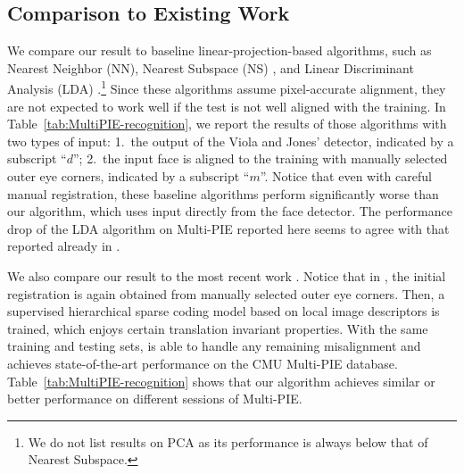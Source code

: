 \documentclass[12pt,journal,draftcls,letterpaper,onecolumn]{IEEEtran}
\begin{document}
\subsection{Comparison to Existing Work}
We compare our result to baseline linear-projection-based
algorithms, such as Nearest Neighbor (NN), Nearest Subspace
(NS) \cite{Lee2005-PAMI}, and Linear Discriminant Analysis
(LDA) \cite{Belhumeur1997-PAMI}.\footnote{We do not list
results on PCA \cite{Turk1991-CVPR} as its performance is
always below that of Nearest Subspace.} Since these algorithms
assume pixel-accurate alignment, they are not expected to work
well if the test is not well aligned with the training. In
Table~\ref{tab:MultiPIE-recognition}, we report the results of
those algorithms with two types of input: 1.\ the output of the
Viola and Jones' detector, indicated by a subscript ``$d$'';
2.\ the input face is aligned to the training with manually
selected outer eye corners, indicated by a subscript ``$m$''.
Notice that even with careful manual registration, these
baseline algorithms perform significantly worse than our
algorithm, which uses input directly from the face detector.
The performance drop of the LDA algorithm on Multi-PIE reported here
seems to agree with that reported already in
\cite{Gross2008-FGR}.

We also compare our result to the most recent work
\cite{Yang2010-CVPR}. Notice that in \cite{Yang2010-CVPR}, the
initial registration is again obtained from manually selected
outer eye corners. Then, a supervised hierarchical sparse
coding model based on local image descriptors is trained, which
enjoys certain translation invariant properties. With the same
training and testing sets, \cite{Yang2010-CVPR} is able to
handle any remaining misalignment and achieves state-of-the-art
performance on the CMU Multi-PIE database.
Table~\ref{tab:MultiPIE-recognition} shows that our algorithm
achieves similar or better performance on different sessions of
Multi-PIE.
\end{document}
